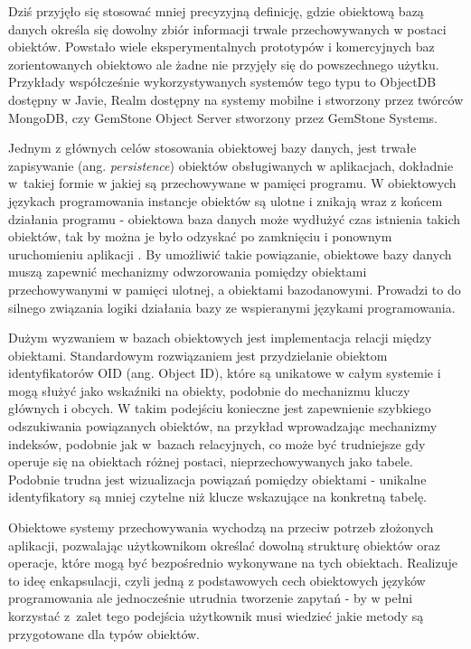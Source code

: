 \documentclass[a4paper,twoside,12pt]{book}
\begin{document}
Dziś przyjęło się stosować mniej precyzyjną definicję, gdzie obiektową bazą danych określa się dowolny zbiór informacji trwale przechowywanych w postaci obiektów. Powstało wiele eksperymentalnych prototypów i komercyjnych baz zorientowanych obiektowo ale żadne nie przyjęły się do powszechnego użytku. Przykłady współcześnie wykorzystywanych systemów tego typu to ObjectDB dostępny w Javie, Realm dostępny na systemy mobilne i stworzony przez twórców MongoDB, czy GemStone Object Server stworzony przez GemStone Systems.

Jednym z głównych celów stosowania obiektowej bazy danych, jest trwałe zapisywanie (ang. \textit{persistence}) obiektów obsługiwanych w aplikacjach, dokładnie w~takiej formie w jakiej są przechowywane w pamięci programu. W obiektowych językach programowania instancje obiektów są ulotne i znikają wraz z końcem działania programu - obiektowa baza danych może wydłużyć czas istnienia takich obiektów, tak by można je było odzyskać po zamknięciu i ponownym uruchomieniu aplikacji \cite{bib:comparison-analysis-of-object-and-or-databases}. By umożliwić takie powiązanie, obiektowe bazy danych muszą zapewnić mechanizmy odwzorowania pomiędzy obiektami przechowywanymi w pamięci ulotnej, a obiektami bazodanowymi. Prowadzi to do silnego związania logiki działania bazy ze wspieranymi językami programowania.

Dużym wyzwaniem w bazach obiektowych jest implementacja relacji między obiektami. Standardowym rozwiązaniem jest przydzielanie obiektom identyfikatorów OID (ang. Object ID), które są unikatowe w całym systemie i mogą służyć jako wskaźniki na obiekty, podobnie do mechanizmu kluczy głównych i obcych. W takim podejściu konieczne jest zapewnienie szybkiego odszukiwania powiązanych obiektów, na przykład wprowadzając mechanizmy indeksów, podobnie jak w~bazach relacyjnych, co może być trudniejsze gdy operuje się na obiektach różnej postaci, nieprzechowywanych jako tabele. Podobnie trudna jest wizualizacja powiązań pomiędzy obiektami - unikalne identyfikatory są mniej czytelne niż klucze wskazujące na konkretną tabelę.

Obiektowe systemy przechowywania wychodzą na przeciw potrzeb złożonych aplikacji, pozwalając użytkownikom określać dowolną strukturę obiektów oraz operacje, które mogą być bezpośrednio wykonywane na tych obiektach. Realizuje to ideę enkapsulacji, czyli jedną z podstawowych cech obiektowych języków programowania ale jednocześnie utrudnia tworzenie zapytań - by w pełni korzystać z~zalet tego podejścia użytkownik musi wiedzieć jakie metody są przygotowane dla typów obiektów.
\end{document}
